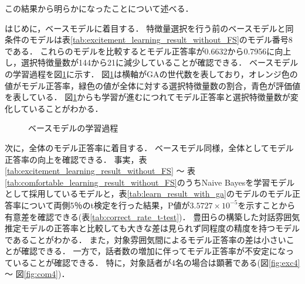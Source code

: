この結果から明らかになったことについて述べる．

はじめに，ベースモデルに着目する．
特徴量選択を行う前のベースモデルと同条件のモデルは表\ref{tab:excitement_learning_result_without_FS}のモデル番号8である．
これらのモデルを比較するとモデル正答率が0.6632から0.7956に向上し，選択特徴量数が144から21に減少していることが確認できる．
ベースモデルの学習過程を図\ref{fig:exc3_crossover}に示す．
図\ref{fig:exc3_crossover}は横軸がGAの世代数を表しており，オレンジ色の値がモデル正答率，緑色の値が全体に対する選択特徴量数の割合，青色が評価値を表している．
図\ref{fig:exc3_crossover}からも学習が進むにつれてモデル正答率と選択特徴量数が変化していることがわかる．

\begin{figure}
    \centering
    \caption{ベースモデルの学習過程}
    \label{fig:exc3_crossover}
\end{figure}

次に，全体のモデル正答率に着目する．
ベースモデル同様，全体としてモデル正答率の向上を確認できる．
事実，表\ref{tab:excitement_learning_result_without_FS} 〜 表\ref{tab:comfortable_learning_result_without_FS}のうちNaive Bayesを学習モデルとして採用しているモデルと，表\ref{tab:learn_result_with_ga}のモデルのモデル正答率について両側5％のt検定を行った結果，P値が$3.5727 \times 10^{-5}$を示すことから有意差を確認できる(表\ref{tab:correct_rate_t-test})．
豊田らの構築した対話雰囲気推定モデルの正答率と比較しても大きな差は見られず同程度の精度を持つモデルであることがわかる．
また，対象雰囲気間によるモデル正答率の差は小さいことが確認できる．
一方で，話者数の増加に伴ってモデル正答率が不安定になっていることが確認できる．
特に，対象話者が4名の場合は顕著である(図\ref{fig:exc4} 〜 図\ref{fig:com4})．

